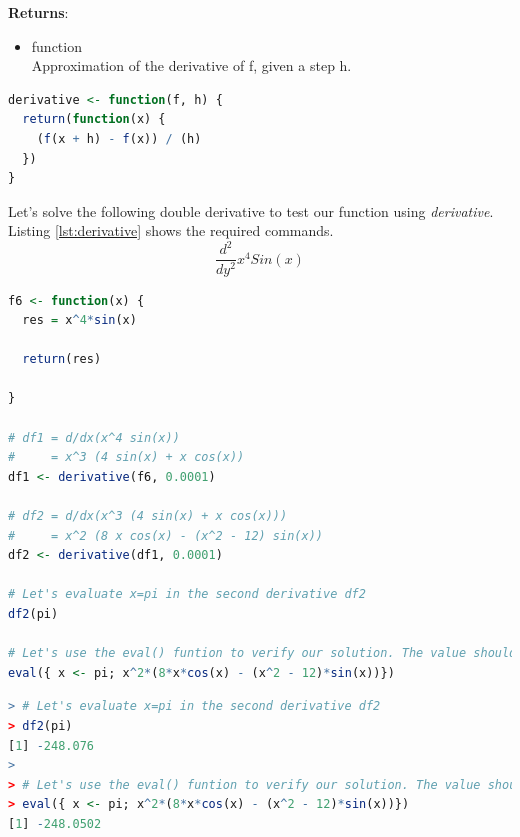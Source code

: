 \documentclass[11pt,a4paper]{article}
\begin{document}
\textbf{Returns}:
\begin{itemize}
  \item {function\\
Approximation of the derivative of f, given a step h.}
\end{itemize}

\clearpage

\begin{lstlisting}[frame=trBL, language=R, caption="The \emph{derivative} function"
\label{lst:derivativeFunct}]
derivative <- function(f, h) {
  return(function(x) {
    (f(x + h) - f(x)) / (h)
  })
}
\end{lstlisting}

Let's solve the following double derivative to test our function using \emph{derivative}. Listing \ref{lst:derivative} shows the required commands.
$$ \frac{d^2}{d y^2} x^4 Sin(x) $$

\begin{lstlisting}[frame=trBL, language=R, caption="Define the function and implement \emph{derivative}"
\label{lst:derivative}]
f6 <- function(x) {
  res = x^4*sin(x)
  
  return(res)
  
}

# df1 = d/dx(x^4 sin(x))
#     = x^3 (4 sin(x) + x cos(x))
df1 <- derivative(f6, 0.0001)

# df2 = d/dx(x^3 (4 sin(x) + x cos(x)))
#     = x^2 (8 x cos(x) - (x^2 - 12) sin(x))
df2 <- derivative(df1, 0.0001)

# Let's evaluate x=pi in the second derivative df2
df2(pi)

# Let's use the eval() funtion to verify our solution. The value should be around df2(pi)
eval({ x <- pi; x^2*(8*x*cos(x) - (x^2 - 12)*sin(x))})
\end{lstlisting}

\clearpage

\begin{lstlisting}[frame=trBL, language=R, caption="Listing \ref{lst:derivative} output"
\label{lst:derivative_out}]
> # Let's evaluate x=pi in the second derivative df2
> df2(pi)
[1] -248.076
> 
> # Let's use the eval() funtion to verify our solution. The value should be around df2(pi)
> eval({ x <- pi; x^2*(8*x*cos(x) - (x^2 - 12)*sin(x))})
[1] -248.0502
\end{lstlisting}

\end{document}
